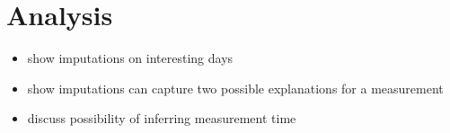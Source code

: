 \documentclass[letter]{article}
\providecommand{\tightlist}{%
      \setlength{\itemsep}{0pt}\setlength{\parskip}{0pt}}
\providecommand{\tightlist}{%
  	  \setlength{\itemsep}{0pt}\setlength{\parskip}{0pt}}
\begin{document}
\section{Analysis}\label{analysis}

\begin{itemize}
\tightlist
\item
  show imputations on interesting days
\item
  show imputations can capture two possible explanations for a
  measurement
\item
  discuss possibility of inferring measurement time
\end{itemize}
    



    
    
    
    
\end{document}
